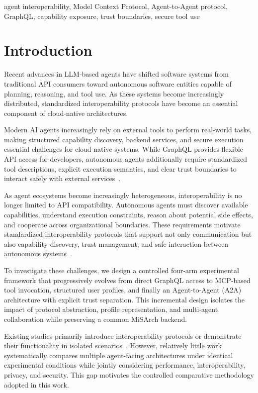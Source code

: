 \documentclass[conference]{IEEEtran}
\begin{document}
\begin{IEEEkeywords}
agent interoperability, Model Context Protocol, Agent-to-Agent protocol, GraphQL, capability exposure, trust boundaries, secure tool use
\end{IEEEkeywords}

\section{Introduction}

Recent advances in LLM-based agents have shifted software systems from
traditional API consumers toward autonomous software entities capable of
planning, reasoning, and tool use. As these systems become increasingly
distributed, standardized interoperability protocols have become an essential
component of cloud-native architectures.

Modern AI agents increasingly rely on external tools to perform real-world
tasks, making structured capability discovery, backend services, and secure
execution essential challenges for cloud-native systems. While GraphQL
provides flexible API access for developers, autonomous agents additionally
require standardized tool descriptions, explicit execution semantics, and
clear trust boundaries to interact safely with external services~\cite{ref1,ref2}.

As agent ecosystems become increasingly heterogeneous, interoperability is no
longer limited to API compatibility. Autonomous agents must discover
available capabilities, understand execution constraints, reason about
potential side effects, and cooperate across organizational boundaries. These
requirements motivate standardized interoperability protocols that support
not only communication but also capability discovery, trust management, and
safe interaction between autonomous systems~\cite{ref2,ref3}.

To investigate these challenges, we design a controlled four-arm experimental
framework that progressively evolves from direct GraphQL access to MCP-based
tool invocation, structured user profiles, and finally an Agent-to-Agent
(A2A) architecture with explicit trust separation. This incremental design
isolates the impact of protocol abstraction, profile representation, and
multi-agent collaboration while preserving a common MiSArch backend.

Existing studies primarily introduce interoperability protocols or
demonstrate their functionality in isolated scenarios~\cite{ref2,ref3}.
However, relatively little work systematically compares multiple agent-facing
architectures under identical experimental conditions while jointly
considering performance, interoperability, privacy, and security. This gap
motivates the controlled comparative methodology adopted in this work.
\end{document}
